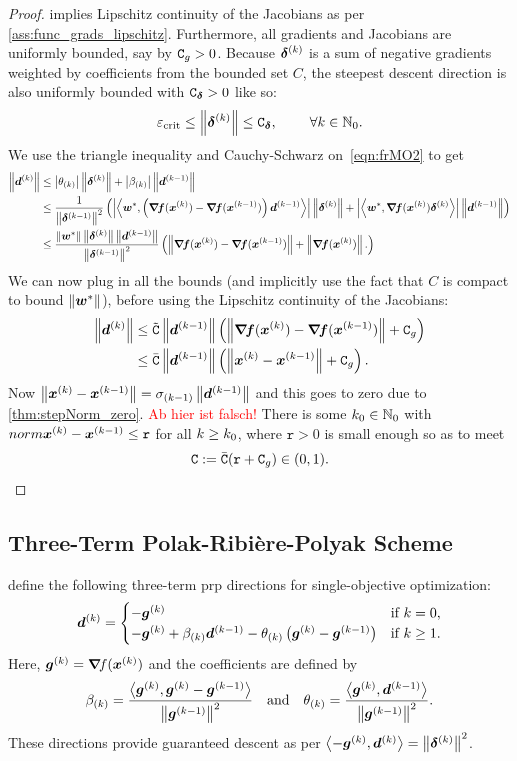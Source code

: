 \documentclass{article}
\theoremstyle{plain}
\theoremstyle{definition}
\begin{document}
\begin{proof}
	 implies
	Lipschitz continuity of the Jacobians as per \cref{ass:func_grads_lipschitz}.
	Furthermore, all gradients and Jacobians are uniformly bounded,
	say by $\mathtt C_g > 0$.
	Because $\bm{\delta}^{(k)}$ is a sum of negative gradients weighted by coefficients from 
	the bounded set $C$, the steepest descent direction is also uniformly bounded 
	with $\mathtt C_{\bm{\delta}} > 0$
	like so:
	$$
	\varepsilon_{\mathrm{crit}} \leq \left\|\bm{\delta}^{(k)}\right\| \leq \mathtt C_{\bm{\delta}}, 
		\qquad \; \forall k\in\mathbb N_0.
	$$
	We use the triangle inequality and Cauchy-Schwarz on~\eqref{eqn:frMO2}
	to get
	\begin{align*}
		\left\|\bm{d}^{(k)}\right\|
		&\leq
		\left|\theta_{(k)}\right|
		\left\|\bm{\delta}^{(k)}\right\|
		+
		\left|\beta_{(k)}\right|
		\left\|\bm{d}^{(k-1)}\right\|
		\\
		&\leq
		\frac{1}{\left\|\bm{\delta}^{(k-1)}\right\|^2}
		\left(
		\left|
			\left\langle \bm{w}^*, 
				\left(\bm{\nabla}\!\bm{f}(\bm{x}^{(k)}) - \bm{\nabla}\!\bm{f}(\bm{x}^{(k-1)})\right)\bm{d}^{(k-1)}	
			 \right\rangle
		\right|
		\left\|\bm{\delta}^{(k)}\right\|
		+
		\left|
			\left\langle \bm{w}^*, \bm{\nabla}\!\bm{f}(\bm{x}^{(k)})\bm{\delta}^{(k)} \right\rangle
		\right|
		\left\|\bm{d}^{(k-1)}\right\|
		\right)
		\\
		&\leq
		\frac{\left\|\bm{w}^*\right\|\left\|\bm{\delta}^{(k)}\right\|	\left\|\bm{d}^{(k-1)}\right\|}{\left\|\bm{\delta}^{(k-1)}\right\|^2}
		\left(
		\left\|\bm{\nabla}\!\bm{f}(\bm{x}^{(k)}) - \bm{\nabla}\!\bm{f}(\bm{x}^{(k-1)})\right\|
		+
		\left\|\bm{\nabla}\!\bm{f}(\bm{x}^{(k)})\right\|.
		\right)	
	\end{align*}
	We can now plug in all the bounds (and implicitly use the fact that 
	$C$ is compact to bound $\left\|\bm{w}^*\right\|$), before using the Lipschitz
	continuity of the Jacobians:
	\begin{align*}
		\left\|\bm{d}^{(k)}\right\|
		&\leq
		\tilde{\mathtt C}
		\left\|\bm{d}^{(k-1)}\right\|
		\left(\left\|\bm{\nabla}\!\bm{f}(\bm{x}^{(k)}) - \bm{\nabla}\!\bm{f}(\bm{x}^{(k-1)})\right\| + \mathtt C_{g}\right)
		\\
		&\leq
		\bar{\mathtt C}
		\left\|\bm{d}^{(k-1)}\right\|
		\left(\left\|\bm{x}^{(k)} - \bm{x}^{(k-1)}\right\| + \mathtt C_{g}\right).
	\end{align*}
	Now $\left\|\bm{x}^{(k)} - \bm{x}^{(k-1)}\right\| = \sigma_{(k-1)} \left\|\bm{d}^{(k-1)}\right\|$ and this goes to zero
	due to \cref{thm:stepNorm_zero}.
	\textcolor{red}{Ab hier ist falsch!}
	There is some $k_0 \in \mathbb N_0$ with 
	$norm{\bm{x}^{(k)} - \bm{x}^{(k-1)}} \leq \mathtt{r}$ for all $k \geq k_0$,
	where $\mathtt{r} > 0$ is small enough so as to meet
	$$
	\mathtt C := \bar{\mathtt C}(\mathtt{r} + \mathtt C_{g}) \in (0,1).
	$$
\end{proof}
\egroup
\subsection{Three-Term Polak-Ribière-Polyak Scheme}
\citet{zhangDescentModifiedPolak2006}
define the following three-term \ac{prp} directions for 
single-objective optimization:
$$
\bm{d}^{(k)} 
= 
\begin{cases}
	-\bm{g}^{(k)}
		&\text{if $k=0$,}
	\\
	-\bm{g}^{(k)}
	+ \beta_{(k)}
	\bm{d}^{(k-1)}
	- \theta_{(k)}
	\left(
		\bm{g}^{(k)} - \bm{g}^{(k-1)}
		\right)
	&\text{if $k\geq1 $.}
\end{cases}
$$
Here, $\bm{g}^{(k)} = \bm{\nabla}\!f(\bm{x}^{(k)})$ and the coefficients are defined by
\begin{equation*}
	\beta_{(k)} = 
	\frac{
		\left\langle \bm{g}^{(k)}, \bm{g}^{(k)}-\bm{g}^{(k-1)} \right\rangle
	}{
		\left\|\bm{g}^{(k-1)}\right\|^2
	}
	\quad\text{and}\quad
	\theta_{(k)}
	=
	\frac{
		\left\langle \bm{g}^{(k)}, \bm{d}^{(k-1)} \right\rangle
	}
	{
		\left\|\bm{g}^{(k-1)}\right\|^2
	}.
\end{equation*}
These directions provide guaranteed descent as per
$\left\langle -\bm{g}^{(k)}, \bm{d}^{(k)} \right\rangle = \left\|\bm{\delta}^{(k)}\right\|^2$.
\end{document}
